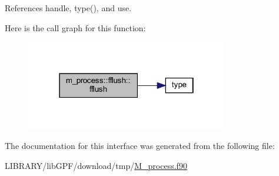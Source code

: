 References handle, type(), and use.

Here is the call graph for this function\+:
\nopagebreak
\begin{figure}[H]
\begin{center}
\leavevmode
\includegraphics[width=250pt]{interfacem__process_1_1fflush_a77d0db933d548b3ee20b064e705a408e_cgraph}
\end{center}
\end{figure}


The documentation for this interface was generated from the following file\+:\begin{DoxyCompactItemize}
\item 
L\+I\+B\+R\+A\+R\+Y/lib\+G\+P\+F/download/tmp/\hyperlink{M__process_8f90}{M\+\_\+process.\+f90}\end{DoxyCompactItemize}

